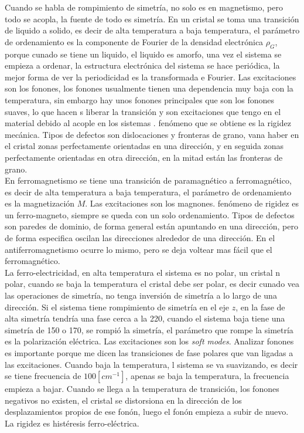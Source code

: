 \documentclass[11pt,fleqn]{book}
\begin{document}
Cuando se habla de rompimiento de simetría, no solo es en magnetismo, pero todo se acopla, la fuente de todo es simetría. En un cristal se toma una transición de liquido a solido, es decir de alta temperatura a baja temperatura, el parámetro de ordenamiento es la componente de Fourier de la densidad electrónica $\rho_{G}$, porque cunado se tiene un liquido, el liquido es amorfo, una vez el sistema se empieza a ordenar, la estructura electrónica del sistema se hace periódica, la mejor forma de ver la periodicidad es la transformada e Fourier. Las excitaciones son los fonones, los fonones usualmente tienen una dependencia muy baja con la temperatura, sin embargo hay unos fonones principales que son los fonones suaves, lo que hacen s liberar la transición y son excitaciones que tengo en el material debido al acople en los sistemas . fenómeno que se obtiene es la rigidez mecánica. Tipos de defectos son dislocaciones y fronteras de grano, vana haber en el cristal zonas perfectamente orientadas en una dirección, y en seguida zonas perfectamente orientadas en otra dirección, en la mitad están las fronteras de grano.\\

En ferromagnetismo se tiene una transición de paramagnético a ferromagnético, es decir de alta temperatura a baja temperatura, el parámetro de ordenamiento es la magnetización $M$. Las excitaciones son los magnones. fenómeno de rigidez es un ferro-magneto, siempre se queda con un solo ordenamiento. Tipos de defectos son paredes de dominio, de forma general están apuntando en una dirección, pero de forma especifica oscilan las direcciones alrededor de una dirección. En el antiferromagnetismo ocurre lo mismo, pero se deja voltear mas fácil que el ferromagnético.\\

La ferro-electricidad, en alta temperatura el sistema es no polar, un cristal n polar, cuando se baja la temperatura el cristal debe ser polar, es decir cunado vea las operaciones de simetría, no tenga inversión de simetría a lo largo de una dirección. Si el sistema tiene rompimiento de simetría en el eje $z$, en la fase de alta simetría tendría una fase cerca a la 220, cuando el sistema baja tiene una simetría de 150 o 170, se rompió la simetría, el parámetro que rompe la simetría es la polarización eléctrica. Las excitaciones son los \emph{soft modes}. Analizar fonones es importante porque me dicen las transiciones de fase polares que van ligadas a las excitaciones. Cuando baja la temperatura, l sistema se va suavizando, es decir se tiene frecuencia de $100 [cm^{-1}]$, apenas se baja la temperatura, la frecuencia empieza a bajar. Cuando se llega a la temperatura de transición, los fonones negativos no existen, el cristal se distorsiona en la dirección de los desplazamientos propios de ese fonón, luego el fonón empieza a subir de nuevo. La rigidez es histéresis ferro-eléctrica.\\
\end{document}
